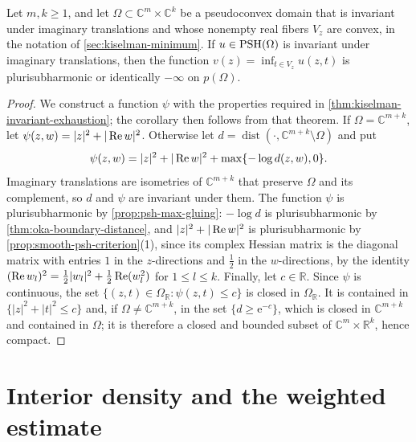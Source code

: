\begin{corollary}\label{cor:kiselman-pseudoconvex-tube}
Let $m,k\ge1$, and let $\Omega\subset\mathbb C^m\times\mathbb C^k$ be a pseudoconvex domain that is invariant under imaginary translations and whose nonempty real fibers $V_z$ are convex, in the notation of \cref{sec:kiselman-minimum}. If $u\in\mathrm{PSH}(\Omega)$ is invariant under imaginary translations, then the function $v(z)=\inf_{t\in V_z}u(z,t)$ is plurisubharmonic or identically $-\infty$ on $p(\Omega)$.
\end{corollary}
\begin{proof}
We construct a function $\psi$ with the properties required in \cref{thm:kiselman-invariant-exhaustion}; the corollary then follows from that theorem. If $\Omega=\mathbb C^{m+k}$, let $\psi(z,w)=|z|^2+|\operatorname{Re} w|^2$. Otherwise let $d=\operatorname{dist}(\cdot,\mathbb C^{m+k}\setminus\Omega)$ and put
\[
 \psi(z,w)=|z|^2+|\operatorname{Re} w|^2+
           \max\{-\log d(z,w),0\}.
\]
Imaginary translations are isometries of $\mathbb C^{m+k}$ that preserve $\Omega$ and its complement, so $d$ and $\psi$ are invariant under them. The function $\psi$ is plurisubharmonic by \cref{prop:psh-max-gluing}: $-\log d$ is plurisubharmonic by \cref{thm:oka-boundary-distance}, and $|z|^2+|\operatorname{Re} w|^2$ is plurisubharmonic by \cref{prop:smooth-psh-criterion}(1), since its complex Hessian matrix is the diagonal matrix with entries $1$ in the $z$-directions and $\frac12$ in the $w$-directions, by the identity $(\operatorname{Re} w_l)^2=\tfrac12|w_l|^2+\tfrac12\operatorname{Re}(w_l^2)$ for $1\le l\le k$. Finally, let $c\in\mathbb R$. Since $\psi$ is continuous, the set $\{(z,t)\in\Omega_{\mathbb R}:\psi(z,t)\le c\}$ is closed in $\Omega_{\mathbb R}$. It is contained in $\{|z|^2+|t|^2\le c\}$ and, if $\Omega\ne\mathbb C^{m+k}$, in the set $\{d\ge\mathrm e^{-c}\}$, which is closed in $\mathbb C^{m+k}$ and contained in $\Omega$; it is therefore a closed and bounded subset of $\mathbb C^m\times\mathbb R^k$, hence compact.
\end{proof}

\section{Interior density and the weighted estimate}
\label{sec:weighted-dbar-estimate}

